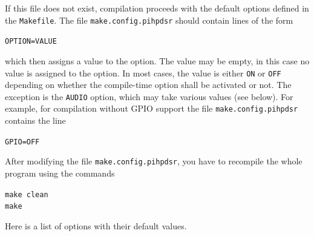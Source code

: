 \documentclass[12pt]{book}
\def\grtt#1{\texttt{\color{magenta}#1}}
\begin{document}
If this file does not exist, compilation proceeds with the default options defined
in the \texttt{Makefile}.  The file
\grtt{make.config.pihpdsr} should contain lines of the form

\texttt{OPTION=VALUE}

which then assigns a value to the option. The value may be empty, in this case no value is assigned
to the option. In most cases, the value is either \texttt{ON} or \texttt{OFF} depending on whether
the compile-time option shall be activated or not.
The exception is the \texttt{AUDIO} option, which may take various values
(see below). For example, for compilation without GPIO support the file \grtt{make.config.pihpdsr}
contains the line

\texttt{GPIO=OFF}

After modifying the file \grtt{make.config.pihpdsr}, you have to recompile the
whole program using the commands


\grtt{make clean} \\
\grtt{make}


Here is a list of options with their default values.
\end{document}
